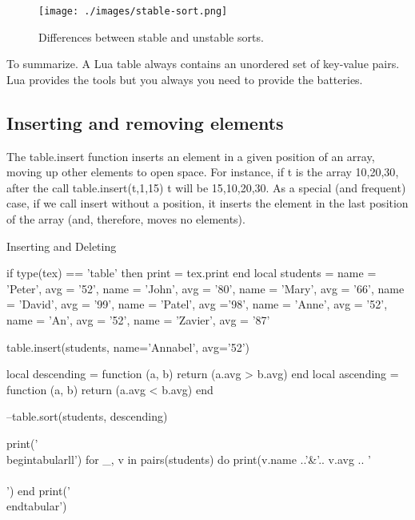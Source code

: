 \begin{figure}[htbp]
\centering

\texttt{[image: ./images/stable-sort.png]}
\caption{Differences between stable and unstable sorts.}
\end{figure}

\begin{scriptexample}{}{}
To summarize. A Lua table always contains an unordered set of key-value pairs. Lua provides the tools but you always you need to provide the batteries.
\end{scriptexample}

\subsection{Inserting and removing elements}

The table.insert function inserts an element in a given position of an array,
moving up other elements to open space. For instance, if t is the array
{10,20,30}, after the call table.insert(t,1,15) t will be {15,10,20,30}. As
a special (and frequent) case, if we call insert without a position, it inserts the
element in the last position of the array (and, therefore, moves no elements).


\begin{texexample}{Inserting and Deleting}{}
\begin{luacode}
if type(tex) == 'table' then print = tex.print end
local students = {
  {name = 'Peter', avg = '52'}, 
  {name = 'John', avg = '80'},
  {name = 'Mary', avg = '66'},
  {name = 'David', avg = '99'}, 
  {name = 'Patel', avg ='98'},
  {name = 'Anne', avg = '52'},
  {name = 'An', avg = '52'},
  {name = 'Zavier', avg = '87'} 
}

table.insert(students, {name='Annabel', avg='52'})

local descending = function (a, b) return (a.avg > b.avg) end
local ascending = function (a, b) return (a.avg < b.avg) end

--table.sort(students, descending)   

print('\\begin{tabular}{ll}')
for _, v in pairs(students) do
   print(v.name ..'&'..  v.avg .. '\\\\')
end
print('\\end{tabular}')
\end{luacode}

\end{texexample}

